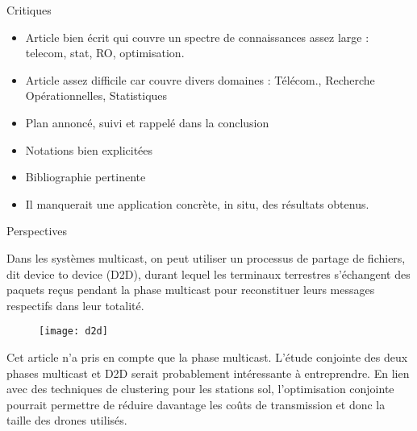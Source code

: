 \begin{frame} {Critiques}
\begin{itemize}
	\item Article bien écrit qui couvre un spectre de connaissances assez large : telecom, stat, RO, optimisation.
	\item Article assez difficile car couvre divers domaines : Télécom., Recherche Opérationnelles, Statistiques
	\item Plan annoncé, suivi et rappelé dans la conclusion
	\item Notations bien explicitées
	\item Bibliographie pertinente
	\item Il manquerait une application concrète, in situ, des résultats obtenus.
\end{itemize}


\end{frame}



\begin{frame} {Perspectives}

Dans les systèmes multicast, on peut utiliser un processus de partage de fichiers,
dit device to device (D2D), durant lequel les terminaux terrestres
s'échangent des paquets reçus pendant la phase multicast pour reconstituer leurs messages
respectifs dans leur totalité. 


\begin{figure}
	\centering
	\texttt{[image: d2d]}
	\label{fig:d2d}
\end{figure}


\end{frame}


\begin{frame} {}

Cet article n'a pris en compte que la phase multicast. L'étude conjointe
des deux phases multicast et D2D serait probablement intéressante à entreprendre.
En lien avec des techniques de clustering pour les stations sol, l'optimisation
conjointe pourrait permettre de réduire davantage les coûts de transmission et donc la taille des drones
utilisés.

\end{frame}